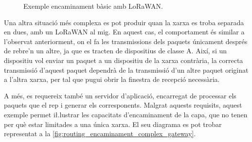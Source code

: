 \documentclass{tfgitic}[2024/07/01]
\begin{document}
{\begin{figure}
    \caption{Exemple encaminament bàsic amb  LoRaWAN.}
    \label{fig:routing_encaminament_basic_gateway}
\end{figure}


Una altra situació més complexa es pot produir quan la xarxa es troba separada en dues, amb un  LoRaWAN al mig. En aquest cas, el comportament és similar a l'observat anteriorment, on el  fa les transmissions dels paquets únicament després de rebre'n un altre, ja que es tracten de dispositius de classe A. Així, si un dispositiu vol enviar un paquet a un dispositiu de la xarxa contrària, la correcta transmissió d'aquest paquet dependrà de la transmissió d'un altre paquet originat a l’altra xarxa, per tal que pugui obrir la finestra de recepció necessària.

A més, es requereix també un servidor d'aplicació, encarregat de processar els paquets que el  rep i generar els  corresponents. Malgrat aquests requisits, aquest exemple permet i\l.lustrar les capacitats d'encaminament de la capa, que no tenen per què estar limitades a una única xarxa. El seu diagrama es pot trobar representat a la \autoref{fig:routing_encaminament_complex_gateway}.

\begin{figure}[h]
    \centering
    \begin{tikzpicture}[
        device/.style={draw=none, minimum width=1cm, minimum height=0.8cm},
        msg/.style={-Stealth, thick},
        wan/.style={-Stealth, thick, dashed},
        timeout/.style={red, thick, dashed},
        node distance=1cm and 3cm,
        timeline/.style={draw, dashed, white},
        fail/.style={thick, cross at end}
    ]
    

\end{tikzpicture}
\end{figure}}
\end{document}
